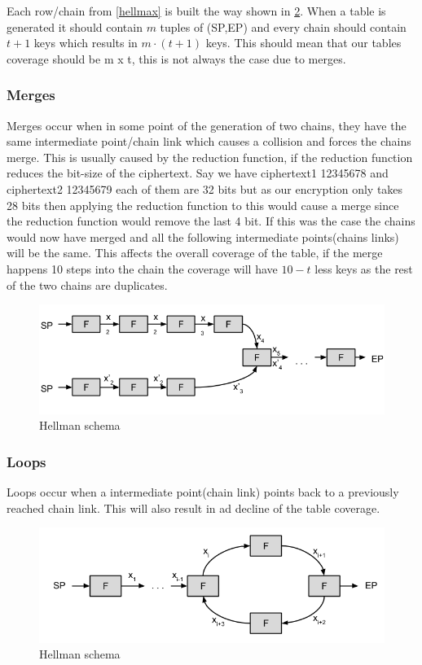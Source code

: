 Each row/chain from \ref{hellmax} is built the way shown in \ref{fig:hellSchema}. When a table is generated it should contain $m$ tuples of (SP,EP) and every chain should contain $t+1$ keys which results in $m\cdot(t+1)$ keys. This should mean that our tables coverage should be m x t, this is not always the case due to merges.

\subsubsection{Merges}
Merges occur when in some point of the generation of two chains, they have the same intermediate point/chain link which causes a collision and  forces the chains merge. This is usually caused by the reduction function, if the reduction function reduces the bit-size of the ciphertext. Say we have ciphertext1 12345678 and ciphertext2 12345679 each of them are 32 bits but as our encryption only takes 28 bits then applying the reduction function to this would cause a merge since the reduction function would remove the last 4 bit. If this was the case the chains would now have merged and all the following intermediate points(chains links) will be the same. This affects the overall coverage of the table, if the merge happens 10 steps into the chain the coverage will have $10 - t$ less keys as the rest of the two chains are duplicates.
\\
\begin{figure}[th]
  \centering
  \includegraphics[width=\textwidth]{figures/Merge.png}
  \caption{Hellman schema}
  \label{fig:hellSchema}
\end{figure}
\subsubsection{Loops}
Loops occur when a intermediate point(chain link) points back to a previously reached chain link. This will also result in ad decline of the table coverage.

\begin{figure}[th]
  \centering
  \includegraphics[width=\textwidth]{figures/Loop.png}
  \caption{Hellman schema}
  \label{fig:hellSchema}
\end{figure}

